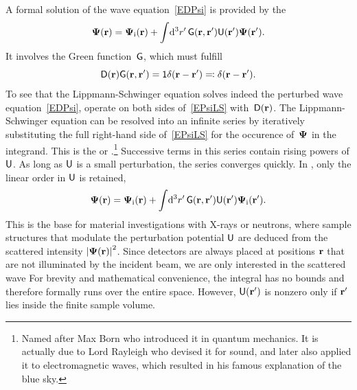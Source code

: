 A formal solution of the wave equation~\cref{EDPsi} is provided
by the 
%
\begin{equation}\label{EPsiLS}
  \mathbf{\Psi}(\mathbf{r})
  = \mathbf{\Psi}_{\text{i}}(\mathbf{r})
  + \int\!\mathrm d^3r'\, \mathsf{G}(\mathbf{r},\mathbf{r}') \mathsf{U}(\mathbf{r}')\mathbf{\Psi}(\mathbf{r}').
\end{equation}
It involves the Green function~$\mathsf{G}$,
%
%
which must fulfill
\begin{equation}\label{EGREEN}
  \mathsf{D}(\mathbf{r})\mathbf{\mathsf{G}}(\mathbf{r},\mathbf{r}') = \mathsf{1} \delta(\mathbf{r}-\mathbf{r}') \eqqcolon \mathsf{\delta}(\mathbf{r}-\mathbf{r}').
\end{equation}
To see that the Lippmann-Schwinger equation solves indeed the perturbed wave equation~\cref{EDPsi},
operate on both sides of~\cref{EPsiLS} with~$\mathsf{D}(\mathbf{r})$.
The Lippmann-Schwinger equation can be resolved into an infinite series
by iteratively substituting the full right-hand side of~\cref{EPsiLS}
for the occurence of~$\mathbf{\Psi}$ in the integrand.
%
%
This is the  or .\footnote
{Named after Max Born who introduced it in quantum mechanics.
It is actually due to Lord Rayleigh who devised it for sound,
and later also applied it to electromagnetic waves,
which resulted in his famous explanation of the blue sky.}
Successive terms in this series contain rising powers of $\mathsf{U}$.
As long as $\mathsf{U}$ is a small perturbation, the series converges quickly.
In ,
%
only the linear order in $\mathsf{U}$ is retained,
\begin{equation}\label{EBorn}
  \mathbf{\Psi}(\mathbf{r})
  = \mathbf{\Psi}_{\text{i}}(\mathbf{r})
  + \int\!\mathrm d^3r'\, \mathsf{G}(\mathbf{r},\mathbf{r}') \mathsf{U}(\mathbf{r}')\mathbf{\Psi}_{\text{i}}(\mathbf{r}').
\end{equation}
This is the base for material investigations with X-rays or neutrons,
where sample structures that modulate the perturbation potential $\mathsf{U}$
are deduced from the scattered intensity ${|\mathbf{\Psi}(\mathbf{r})|}^2$.
Since detectors are always placed at positions $\mathbf{r}$
that are not illuminated by the incident beam,
we are only interested in the scattered wave
%
%
%
%
For brevity and mathematical convenience,
the integral has no bounds
and therefore formally runs over the entire space.
However, $\mathsf{U}(\mathbf{r}')$ is nonzero only if $\mathbf{r}'$ lies inside the finite sample volume.

